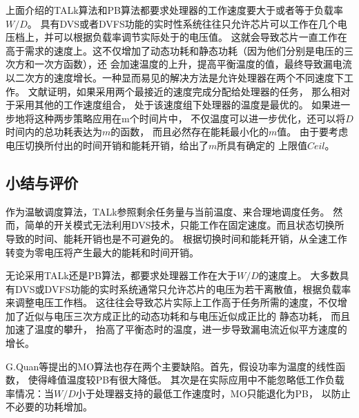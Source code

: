 上面介绍的TALk算法和PB算法都要求处理器的工作速度要大于或者等于负载率$W/D$。 具有DVS或者DVFS功能的实时性系统往往只允许芯片可以工作在几个电压档上，并可以根据负载率调节实际处于的电压值。 这就会导致芯片一直工作在高于需求的速度上。这不仅增加了动态功耗和静态功耗（因为他们分别是电压的三次方和一次方函数），还 会加速温度的上升，提高平衡温度的值，最终导致漏电流以二次方的速度增长。一种显而易见的解决方法是允许处理器在两个不同速度下工作。 文献证明，如果采用两个最接近的速度完成分配给处理器的任务， 那么相对于采用其他的工作速度组合， 处于该速度组下处理器的温度是最优的。 如果进一步地将这种两步策略应用在m个时间片中， 不仅温度可以进一步优化，还可以将$D$时间内的总功耗表达为$m$的函数， 而且必然存在能耗最小化的$m$值。 由于要考虑电压切换所付出的时间开销和能耗开销，给出了$m$所具有确定的 上限值$Ceil$。

\subsection{小结与评价}
作为温敏调度算法，TALk参照剩余任务量与当前温度、来合理地调度任务。 然而，简单的开关模式无法利用DVS技术，只能工作在固定速度。而且状态切换所导致的时间、能耗开销也是不可避免的。 根据切换时间和能耗开销，从全速工作转变为零电压将产生最大的能耗和时间开销。

无论采用TALk还是PB算法，都要求处理器工作在大于$W/D$的速度上。 大多数具有DVS或DVFS功能的实时系统通常只允许芯片的电压为若干离散值，根据负载率来调整电压工作档。 这往往会导致芯片实际上工作高于任务所需的速度，不仅增加了近似与电压三次方成正比的动态功耗和与电压近似成正比的 静态功耗， 而且加速了温度的攀升， 抬高了平衡态时的温度，进一步导致漏电流近似平方速度的增长。

G.Quan等提出的MO算法也存在两个主要缺陷。首先，假设功率为温度的线性函数， 使得峰值温度较PB有很大降低。 其次是在实际应用中不能忽略低工作负载率情况：当$W/D$小于处理器支持的最低工作速度时，MO只能退化为PB， 以防止不必要的功耗增加。

